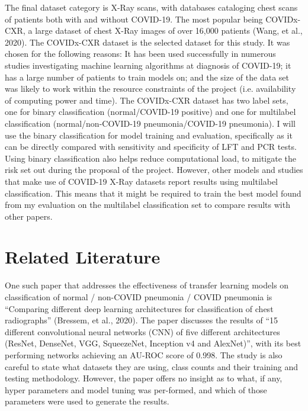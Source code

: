 The final dataset category is X-Ray scans, with databases cataloging chest scans of patients both with and without COVID-19. The most popular being COVIDx-CXR, a large dataset of chest X-Ray images of over 16,000 patients (Wang, et al., 2020). The COVIDx-CXR dataset is the selected dataset for this study. It was chosen for the following reasons: It has been used successfully in numerous studies investigating machine learning algorithms at diagnosis of COVID-19; it has a large number of patients to train models on; and the size of the data set was likely to work within the resource constraints of the project (i.e. availability of computing power and time). The COVIDx-CXR dataset has two label sets, one for binary classification (normal/COVID-19 positive) and one for multilabel classification (normal/non-COVID-19 pneumonia/COVID-19 pneumonia). I will use the binary classification for model training and evaluation, specifically as it can be directly compared with sensitivity and specificity of LFT and PCR tests. Using binary classification also helps reduce computational load, to mitigate the risk set out during the proposal of the project. However, other models and studies that make use of COVID-19 X-Ray datasets report results using multilabel classification. This means that it might be required to train the best model found from my evaluation on the multilabel classification set to compare results with other papers.

\section{Related Literature}
One such paper that addresses the effectiveness of transfer learning models on classification of normal / non-COVID pneumonia / COVID pneumonia is “Comparing different deep learning architectures for classification of chest radiographs” (Bressem, et al., 2020). The paper discusses the results of “15 different convolutional neural networks (CNN) of five different architectures (ResNet, DenseNet, VGG, SqueezeNet, Inception v4 and AlexNet)”, with its best performing networks achieving an AU-ROC score of 0.998. The study is also careful to state what datasets they are using, class counts and their training and testing methodology. However, the paper offers no insight as to what, if any, hyper parameters and model tuning was per-formed, and which of those parameters were used to generate the results. 

